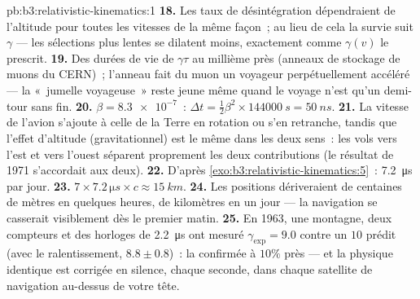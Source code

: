 \begin{solution}{pb:b3:relativistic-kinematics:1}
\textbf{18.} Les taux de désintégration dépendraient de l'altitude pour
toutes les vitesses de la même façon~; au lieu de cela la survie suit
$\gamma$ --- les sélections plus lentes se dilatent moins, exactement
comme $\gamma(v)$ le prescrit.
\textbf{19.} Des durées de vie de $\gamma\tau$ au millième près
(anneaux de stockage de muons du CERN)~; l'anneau fait du muon un
voyageur perpétuellement accéléré --- la «~jumelle voyageuse~» reste
jeune même quand le voyage n'est qu'un demi-tour sans fin.
\textbf{20.} $\beta = \num{8.3e-7}$~: $\Delta t = \tfrac12\beta^2
\times \qty{144000}{s} = \qty{50}{ns}$.
\textbf{21.} La vitesse de l'avion s'ajoute à celle de la Terre en
rotation ou s'en retranche, tandis que l'effet d'altitude
(gravitationnel) est le même dans les deux sens~: les vols vers l'est
et vers l'ouest séparent proprement les deux contributions (le
résultat de 1971 s'accordait aux deux).
\textbf{22.} D'après \cref{exo:b3:relativistic-kinematics:5}~:
\qty{7.2}{\micro s} par jour.
\textbf{23.} $7 \times 7.2\,\unit{\micro s} \times c \approx
\qty{15}{km}.$
\textbf{24.} Les positions dériveraient de centaines de mètres en
quelques heures, de kilomètres en un jour --- la navigation se
casserait visiblement dès le premier matin.
\textbf{25.} En 1963, une montagne, deux compteurs et des horloges de
\qty{2.2}{\micro s} ont mesuré $\gamma_{\exp} = 9.0$ contre un $10$
prédit (avec le ralentissement, $8.8 \pm 0.8$)~: la 
confirmée à $10\%$ près --- et la physique identique est corrigée en
silence, chaque seconde, dans chaque satellite de navigation
au-dessus de votre tête.
\end{solution}
